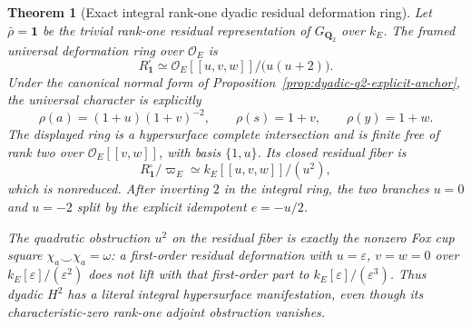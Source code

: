 \documentclass[11pt]{article}
\newtheorem{theorem}{Theorem}[section]
\theoremstyle{definition}
\begin{document}
\begin{theorem}[Exact integral rank-one dyadic residual deformation ring]
\label{thm:dyadic-q2-rankone-integral-ring}
Let $\bar\rho=\mathbf1$ be the trivial
rank-one residual representation
of $G_{\mathbf Q_2}$ over $k_E$.
The framed universal deformation ring
over $\mathcal O_E$ is
\begin{equation}\label{eq:dyadic-q2-rankone-integral-ring}
\boxed{\quad
R_{\mathbf1}^{\square}
\simeq
\mathcal O_E[[u,v,w]]/
\bigl(u(u+2)\bigr).
\quad}
\end{equation}
Under the canonical normal form of
Proposition~\ref{prop:dyadic-q2-explicit-anchor},
the universal character is explicitly
\begin{equation}\label{eq:dyadic-q2-rankone-transport}
\rho(a)=(1+u)(1+v)^{-2},\qquad
\rho(s)=1+v,\qquad
\rho(y)=1+w.
\end{equation}
The displayed ring is a hypersurface
complete intersection and is finite
free of rank two over
$\mathcal O_E[[v,w]]$, with basis
$\{1,u\}$.  Its closed residual
fiber is
\begin{equation}\label{eq:dyadic-q2-rankone-special-fiber}
R_{\mathbf1}^{\square}/\varpi_E
\simeq
k_E[[u,v,w]]/(u^2),
\end{equation}
which is nonreduced.  After
inverting $2$ in the integral
ring, the two branches $u=0$
and $u=-2$ split by the explicit
idempotent $e=-u/2$.

The quadratic obstruction $u^2$
on the residual fiber is exactly
the nonzero Fox cup square
$\chi_a\smile\chi_a=\omega$:
a first-order residual deformation
with $u=\varepsilon$, $v=w=0$
over $k_E[\varepsilon]/(\varepsilon^2)$
does not lift with that first-order
part to $k_E[\varepsilon]/(\varepsilon^3)$.
Thus dyadic $H^2$ has a literal
integral hypersurface manifestation,
even though its characteristic-zero
rank-one adjoint obstruction vanishes.
\end{theorem}
\end{document}
